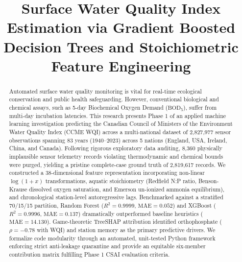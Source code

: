 \documentclass[conference]{IEEEtran}
\begin{document}
\title{Surface Water Quality Index Estimation via Gradient Boosted Decision Trees and Stoichiometric Feature Engineering}

\author{
}

\maketitle

\begin{abstract}
Automated surface water quality monitoring is vital for real-time ecological conservation and public health safeguarding. However, conventional biological and chemical assays, such as 5-day Biochemical Oxygen Demand ($\text{BOD}_5$), suffer from multi-day incubation latencies. This research presents Phase 1 of an applied machine learning investigation predicting the Canadian Council of Ministers of the Environment Water Quality Index (CCME WQI) across a multi-national dataset of 2,827,977 sensor observations spanning 83 years (1940--2023) across 5 nations (England, USA, Ireland, China, and Canada). Following rigorous exploratory data auditing, 8,360 physically implausible sensor telemetry records violating thermodynamic and chemical bounds were purged, yielding a pristine complete-case ground truth of 2,819,617 records. We constructed a 38-dimensional feature representation incorporating non-linear $\log(1+x)$ transformations, aquatic stoichiometry (Redfield N:P ratio, Benson-Krause dissolved oxygen saturation, and Emerson un-ionized ammonia equilibrium), and chronological station-level autoregressive lags. Benchmarked against a stratified 70/15/15 partition, Random Forest ($R^2 = 0.9999$, $\text{MAE} = 0.052$) and XGBoost ($R^2 = 0.9996$, $\text{MAE} = 0.137$) dramatically outperformed baseline heuristics ($\text{MAE} = 14.130$). Game-theoretic TreeSHAP attribution identified orthophosphate ($\rho = -0.78$ with WQI) and station memory as the primary predictive drivers. We formalize code modularity through an automated, unit-tested Python framework enforcing strict anti-leakage quarantine and provide an equitable six-member contribution matrix fulfilling Phase 1 CSAI evaluation criteria.
\end{abstract}
\end{document}
